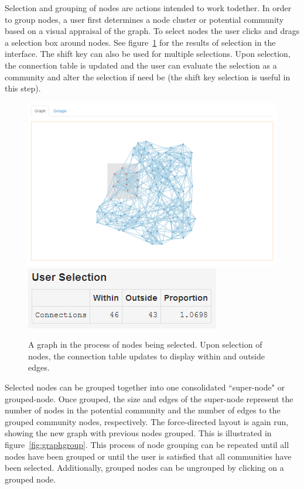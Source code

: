 \documentclass{article}\usepackage[]{graphicx}\usepackage[]{color}
\begin{document}
Selection and grouping of nodes are actions intended to work todether. In order to group nodes, a user first determines a node cluster or potential community based on a visual appraisal of the graph. To select nodes the user clicks and drags a selection box around nodes. See figure~\ref{fig:graphselect} for the results of selection in the interface. The shift key can also be used for multiple selections. Upon selection, the connection table is updated and the user can evaluate the selection as a community and alter the selection if need be (the shift key selection is useful in this step).

\begin{figure}[H]
\centering
\includegraphics[width=\textwidth]{images/graphselect.png}
\includegraphics[]{images/tableselect.png}
\caption{\label{fig:graphselect} A graph in the process of nodes being selected. Upon selection of nodes, the connection table updates to display within and outside edges.}
\end{figure}

Selected nodes can be grouped together into one consolidated ``super-node" or grouped-node. Once grouped, the size and edges of the super-node represent the number of nodes in the potential community and the number of edges to the grouped community nodes, respectively. The force-directed layout is again run, showing the new graph with previous nodes grouped. This is illustrated in figure~\ref{fig:graphgroup}. This process of node grouping can be repeated until all nodes have been grouped or until the user is satisfied that all communities have been selected. Additionally, grouped nodes can be ungrouped by clicking on a grouped node. 
\end{document}
